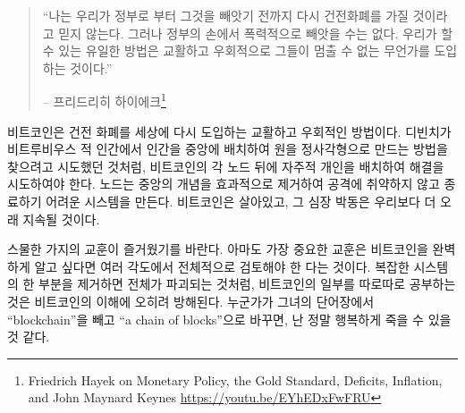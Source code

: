 \begin{quotation}\begin{samepage}
\enquote{나는 우리가 정부로 부터 그것을 빼앗기 전까지 다시 건전화폐를 가질 것이라고 믿지 않는다. 그러나 정부의 손에서 폭력적으로 빼앗을 수는 없다. 우리가 할 수 있는 유일한 방법은 교활하고 우회적으로 그들이 멈출 수 없는 무언가를 도입하는 것이다.}
\begin{flushright} -- 프리드리히 하이에크\footnote{Friedrich Hayek on Monetary Policy, the Gold Standard, Deficits, Inflation, and John Maynard Keynes \url{https://youtu.be/EYhEDxFwFRU}}
\end{flushright}\end{samepage}\end{quotation}

\begin{comment}
Bitcoin is the sly, roundabout way to re-introduce good money to the world. It
does so by placing a sovereign individual behind each node, just like Da Vinci
tried to solve the intractable problem of squaring a circle by placing the
Vitruvian Man in its center. Nodes effectively remove any concept of a center,
creating a system which is astonishingly antifragile and extremely hard to shut
down. Bitcoin lives, and its heartbeat will probably outlast all of ours.
\end{comment}
비트코인은 건전 화폐를 세상에 다시 도입하는 교활하고 우회적인 방법이다.
디빈치가 비트루비우스 적 인간에서 인간을 중앙에 배치하여 원을 정사각형으로 만드는 방법을 찾으려고 시도했던 것처럼,
비트코인의 각 노드 뒤에 자주적 개인을 배치하여 해결을 시도하여야 한다.
노드는 중앙의 개념을 효과적으로 제거하여 공격에 취약하지 않고 종료하기 어려운 시스템을 만든다.
비트코인은 살아있고, 그 심장 박동은 우리보다 더 오래 지속될 것이다.

\begin{comment}
I hope you have enjoyed these twenty-one lessons. Maybe the most important
lesson is that Bitcoin should be examined holistically, from multiple angles, if
one would like to have something approximating a complete picture. Just like
removing one part from a complex system destroys the whole, examining parts of
Bitcoin in isolation seems to taint the understanding of it. If only one person
strikes \enquote{blockchain} from her vocabulary and replaces it with \enquote{a
chain of blocks} I will die a happy man.
\end{comment}
스물한 가지의 교훈이 즐거웠기를 바란다. 
아마도 가장 중요한 교훈은 비트코인을 완벽하게 알고 싶다면 여러 각도에서 전체적으로 검토해야 한 다는 것이다. 
복잡한 시스템의 한 부분을 제거하면 전체가 파괴되는 것처럼, 
비트코인의 일부를 따로따로 공부하는 것은 비트코인의 이해에 오히려 방해된다.
누군가가 그녀의 단어장에서 \enquote{blockchain}을 빼고 \enquote{a chain of blocks}으로 바꾸면,
난 정말 행복하게 죽을 수 있을 것 같다.


